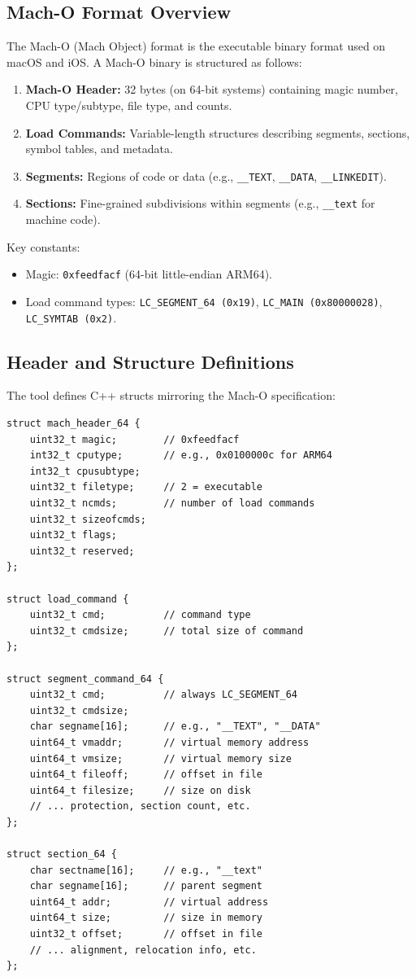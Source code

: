 \documentclass[12pt,a4paper]{article}
\begin{document}
\subsection{Mach-O Format Overview}

The Mach-O (Mach Object) format is the executable binary format used on macOS and iOS. A Mach-O binary is structured as follows:

\begin{enumerate}
  \item \textbf{Mach-O Header:} 32 bytes (on 64-bit systems) containing magic number, CPU type/subtype, file type, and counts.
  \item \textbf{Load Commands:} Variable-length structures describing segments, sections, symbol tables, and metadata.
  \item \textbf{Segments:} Regions of code or data (e.g., \texttt{\_\_TEXT}, \texttt{\_\_DATA}, \texttt{\_\_LINKEDIT}).
  \item \textbf{Sections:} Fine-grained subdivisions within segments (e.g., \texttt{\_\_text} for machine code).
\end{enumerate}

Key constants:
\begin{itemize}
  \item Magic: \texttt{0xfeedfacf} (64-bit little-endian ARM64).
  \item Load command types: \texttt{LC\_SEGMENT\_64 (0x19)}, \texttt{LC\_MAIN (0x80000028)}, \texttt{LC\_SYMTAB (0x2)}.
\end{itemize}

\subsection{Header and Structure Definitions}

The tool defines C++ structs mirroring the Mach-O specification:

\begin{lstlisting}
struct mach_header_64 {
    uint32_t magic;        // 0xfeedfacf
    int32_t cputype;       // e.g., 0x0100000c for ARM64
    int32_t cpusubtype;
    uint32_t filetype;     // 2 = executable
    uint32_t ncmds;        // number of load commands
    uint32_t sizeofcmds;
    uint32_t flags;
    uint32_t reserved;
};

struct load_command {
    uint32_t cmd;          // command type
    uint32_t cmdsize;      // total size of command
};

struct segment_command_64 {
    uint32_t cmd;          // always LC_SEGMENT_64
    uint32_t cmdsize;
    char segname[16];      // e.g., "__TEXT", "__DATA"
    uint64_t vmaddr;       // virtual memory address
    uint64_t vmsize;       // virtual memory size
    uint64_t fileoff;      // offset in file
    uint64_t filesize;     // size on disk
    // ... protection, section count, etc.
};

struct section_64 {
    char sectname[16];     // e.g., "__text"
    char segname[16];      // parent segment
    uint64_t addr;         // virtual address
    uint64_t size;         // size in memory
    uint32_t offset;       // offset in file
    // ... alignment, relocation info, etc.
};
\end{lstlisting}
\end{document}
